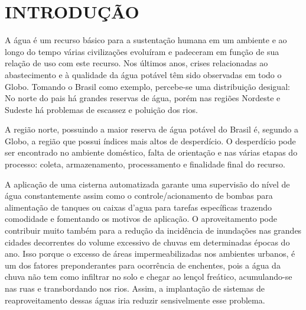 
\chapter{INTRODUÇÃO}
\label{chap:introducao}


A água é um recurso básico para a sustentação humana em um ambiente e ao longo do tempo várias civilizações evoluíram e padeceram em função de sua relação de uso com este recurso. Nos últimos anos, crises relacionadas ao abastecimento e à qualidade da água potável têm sido observadas em todo o Globo. Tomando o Brasil como exemplo, percebe-se uma distribuição desigual: No norte do pais há grandes reservas de água, porém nas regiões Nordeste e Sudeste há problemas de escassez e poluição dos rios.


A região norte, possuindo a maior reserva de água potável do Brasil é, segundo a Globo, a região que possui índices mais altos de desperdício. O desperdício pode ser encontrado no ambiente doméstico, falta de orientação e nas várias etapas do processo: coleta, armazenamento, processamento e finalidade final do recurso. 

A aplicação de uma cisterna automatizada garante uma supervisão do nível de água constantemente assim como o controle/acionamento de bombas para alimentação de tanques ou caixas d’agua para tarefas específicas trazendo comodidade e fomentando os motivos de aplicação. O aproveitamento pode contribuir muito também para a redução da
incidência de inundações nas grandes cidades decorrentes do volume excessivo de chuvas em
determinadas épocas do ano. Isso porque o excesso de áreas impermeabilizadas nos ambientes
urbanos, é um dos fatores preponderantes para ocorrência de enchentes, pois a água da chuva
não tem como infiltrar no solo e chegar ao lençol freático, acumulando-se nas ruas e
transbordando nos rios. Assim, a implantação de sistemas de reaproveitamento dessas águas
iria reduzir sensivelmente esse problema.